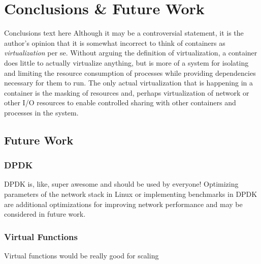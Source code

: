 \chapter{Conclusions \& Future Work}
\label{cha:conclusions}
\label{sec:conclusions}
Conclusions text here
Although it may be a controversial statement, it is the author's opinion that it is somewhat incorrect to think of containers as \emph{virtualization} per se.  
Without arguing the definition of virtualization, a container does little to actually virtualize anything, but is more of a system for isolating and limiting the resource consumption of processes while providing dependencies necessary for them to run.  
The only actual virtualization that is happening in a container is the masking of resources and, perhaps virtualization of network or other I/O resources to enable controlled sharing with other containers and processes in the system. 


\section{Future Work}
\label{sec:future_work}
\subsection{DPDK}
DPDK is, like, super awesome and should be used by everyone!
Optimizing parameters of the network stack in Linux or implementing benchmarks in DPDK are additional optimizations for improving network performance and may be considered in future work.

\subsection{Virtual Functions}
\label{sec:virtual_functions}
Virtual functions would be really good for scaling

